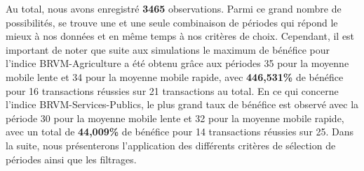 Au total, nous avons enregistré \textbf{3465} observations. Parmi ce
grand nombre de possibilités, se trouve une et une seule combinaison de
périodes qui répond le mieux à nos données et en même temps à nos
critères de choix. Cependant, il est important de noter que suite aux
simulations le maximum de bénéfice pour l'indice BRVM-Agriculture a été
obtenu grâce aux périodes 35 pour la moyenne mobile lente et 34 pour la
moyenne mobile rapide, avec \textbf{446,531\%} de bénéfice pour 16
transactions réussies sur 21 transactions au total. En ce qui concerne
l'indice BRVM-Services-Publics, le plus grand taux de bénéfice est
observé avec la période 30 pour la moyenne mobile lente et 32 pour la
moyenne mobile rapide, avec un total de \textbf{44,009\%} de bénéfice
pour 14 transactions réussies sur 25. Dans la suite, nous présenterons
l'application des différents critères de sélection de périodes ainsi que
les filtrages.

